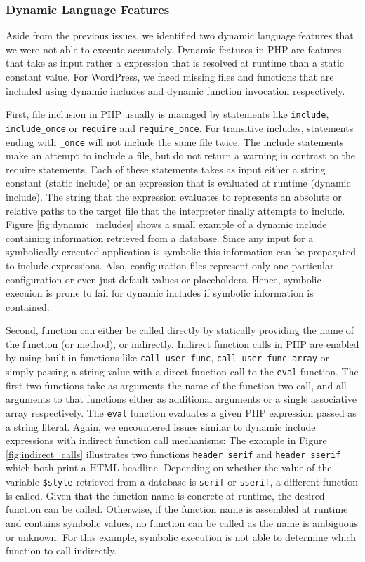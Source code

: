 \documentclass[sigconf]{acmart}
\renewcommand{\sf}[1]{\textsf{#1}}
\renewcommand{\tt}[1]{\texttt{#1}}
\begin{document}
\subsubsection{Dynamic Language Features}
\label{sec:experiment_dynamicfeatures} 
Aside from the previous issues, we identified two dynamic language features
that we were not able to execute accurately. Dynamic features in PHP are
features that take as input rather a expression that is resolved at runtime
than a static constant value. For \sf{WordPress}, we faced missing files and
functions that are included using dynamic includes and dynamic function
invocation respectively.

First, file inclusion in PHP usually is managed by statements like \tt{include},
\tt{include\_once} or \tt{require} and \tt{require\_once}. For transitive
includes, statements ending with \tt{\_once} will not include the same file
twice. The include statements make an attempt to include a file, but do not
return a warning in contrast to the require statements. Each of these
statements takes as input either a string constant (static include) or an
expression that is evaluated at runtime (dynamic include). The string that the
expression evaluates to represents an absolute or relative paths to the target
file that the interpreter finally attempts to include.
Figure \ref{fig:dynamic_includes} shows a small example of a dynamic include containing
information retrieved from a database. Since any input for a symbolically
executed application is symbolic this information can be propagated to include
expressions. Also, configuration files represent only one particular
configuration or even just default values or placeholders. Hence, symbolic
execuion is prone to fail for dynamic includes if symbolic information is contained.

Second, function can either be called directly by statically providing the name
of the function (or method), or indirectly. Indirect function calls in PHP are
enabled by using built-in functions like \tt{call\_user\_func},
\tt{call\_user\_func\_array} or simply passing a string value with a direct
function call to the \tt{eval} function. The first two functions take as
arguments the name of the function two call, and all arguments to that
functions either as additional arguments or a single associative array
respectively.
The \tt{eval} function evaluates a given PHP expression passed as a string
literal.
Again, we encountered issues similar to dynamic include expressions with
indirect function call mechanisms: The example in Figure
\ref{fig:indirect_calls} illustrates two functions \tt{header\_serif} and
\tt{header\_sserif} which both print a HTML headline. Depending on whether the
value of the variable \tt{\$style} retrieved from a database is \tt{serif} or
\tt{sserif}, a different function is called. Given that the function name is 
concrete at runtime, the desired function can be called. Otherwise, if the
function name is assembled at runtime and contains symbolic values, no function
can be called as the name is ambiguous or unknown. For this example, symbolic
execution is not able to determine which function to call indirectly.
\end{document}
